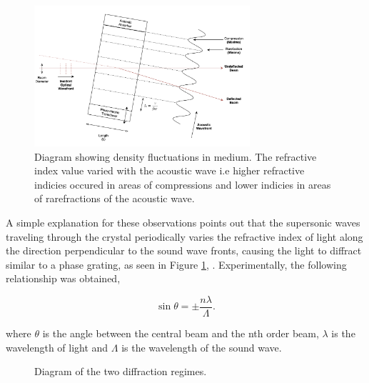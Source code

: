 \documentclass[aps,prl,reprint,10pt,amsmath,amssymb,superscriptaddress,a4paper]{revtex4-2}
\begin{document}
\begin{figure}
    \includegraphics[width = 8cm]{../Figures/aodiagram.png}
    \caption{Diagram showing density fluctuations in medium. The refractive index value varied with the acoustic wave i.e higher 
    refractive indicies occured in areas of compressions and lower indicies in areas of rarefractions of the acoustic wave.}
    \label{fig:aodiagram}
\end{figure}

A simple explanation for these observations points out that the supersonic waves traveling through the crystal periodically varies 
the refractive index of light along the direction perpendicular to the sound wave fronts, causing the light to diffract similar to 
a phase grating, as seen in Figure \ref{fig:aodiagram}, \citep{RamanNath}. Experimentally, the following relationship was obtained,

\begin{equation}
    \sin{\theta} = \pm \frac{n\lambda}{\Lambda}.
    \label{eqn:RamanNath}
\end{equation}

where $\theta$ is the angle between the central beam and the nth order beam, $\lambda$ is the wavelength of light and $\Lambda$ is the 
wavelength of the sound wave.

\begin{figure}
    \centering
    \caption{Diagram of the two diffraction regimes.}
    \label{fig:diagrams}
\end{figure}
\end{document}
